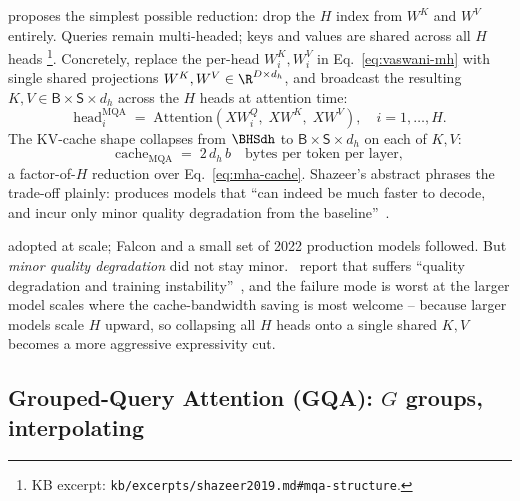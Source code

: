 \citet{shazeer2019} proposes the simplest possible reduction: drop the
$H$ index from $W^K$ and $W^V$ entirely. Queries remain multi-headed;
keys and values are shared across all $H$  heads%
\footnote{KB excerpt:
\nolinkurl{kb/excerpts/shazeer2019.md#mqa-structure}.}.
Concretely, replace the per-head $W_i^K, W_i^V$ in Eq.~\eqref{eq:vaswani-mh}
with single shared projections $W^K, W^V \in \R^{D \times d_h}$, and
broadcast the resulting $K, V \in \mathsf{B}\!\times\!\mathsf{S}\!\times\!d_h$
across the $H$  heads at attention time:
\begin{equation}
  \mathrm{head}_i^{\mathrm{MQA}}
   \;=\; \mathrm{Attention}(X W_i^Q,\; X W^K,\; X W^V),
   \quad i = 1, \ldots, H.
  \label{eq:mqa-head}
\end{equation}
The KV-cache shape collapses from $\BHSdh$ to
$\mathsf{B}\!\times\!\mathsf{S}\!\times\!d_h$ on each of $K, V$:
\begin{equation}
  \mathrm{cache}_{\mathrm{MQA}}
  \;=\; 2\,d_h\,b
  \quad\text{bytes per token per layer},
  \label{eq:mqa-cache}
\end{equation}
a factor-of-$H$ reduction over Eq.~\eqref{eq:mha-cache}. Shazeer's
abstract phrases the trade-off plainly:  produces models that
``can indeed be much faster to decode, and incur only minor quality
degradation from the baseline''~\citep[abstract]{shazeer2019}.

 \citep{chowdhery2022} adopted  at scale; Falcon and a small
set of 2022 production  models followed. But \emph{minor
quality degradation} did not stay minor.~\citet{ainslie2023} report
that  suffers ``quality degradation and training
instability''~\citep[\S 1]{ainslie2023}, and the failure mode is
worst at the larger model scales where the cache-bandwidth saving is
most welcome -- because larger models scale $H$ upward, so collapsing
all $H$ heads onto a single shared $K, V$ becomes a more aggressive
expressivity cut.

\subsection{Grouped-Query Attention (GQA): $G$ groups, interpolating}
\label{sec:attn-gqa}

